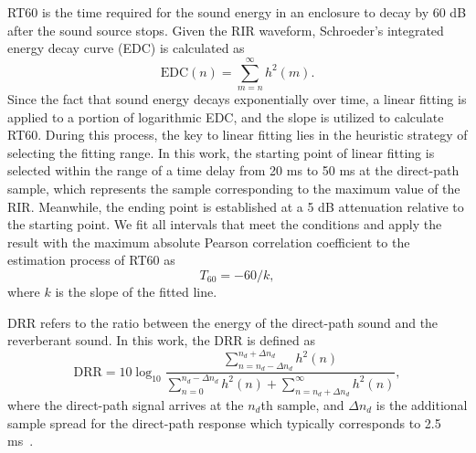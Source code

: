 RT60 is the time required for the sound energy in an enclosure to decay by 60 dB after the sound source stops.
Given the RIR waveform, Schroeder’s integrated energy decay curve (EDC) is calculated as~\cite{schroeder1965new}
\begin{equation}
\label{eq:edc}
    \mathrm{EDC}(n)=\sum_{m=n}^{\infty}h^2(m).
\end{equation}
Since the fact that sound energy decays exponentially over time, a linear fitting is applied to a portion of logarithmic EDC, and the slope is utilized to calculate RT60.
During this process, the key to linear fitting lies in the heuristic strategy of selecting the fitting range.
In this work, the starting point of linear fitting is selected within the range of a time delay from 20 ms to 50 ms at the direct-path sample, which represents the sample corresponding to the maximum value of the RIR. 
Meanwhile, the ending point is established at a 5 dB attenuation relative to the starting point.
We fit all intervals that meet the conditions and apply the result with the maximum absolute Pearson correlation coefficient to the estimation process of RT60 as
\begin{equation}
    T_{60}=-60/k,
\end{equation}
where $k$ is the slope of the fitted line.

DRR refers to the ratio between the energy of the direct-path sound and the reverberant sound.
In this work, the DRR is defined as
\begin{equation}
    \mathrm{DRR}=10\log_{10}\frac{\sum_{n=n_d-\Delta n_d}^{n_d+\Delta n_d}h^2(n)}{\sum_{n=0}^{n_d-\Delta n_d}h^2(n)+\sum_{n=n_d+\Delta n_d}^{\infty}h^2(n)},
\end{equation}
where the direct-path signal arrives at the $n_d$th sample, and $\Delta n_d$ is the additional sample spread for the direct-path response which typically corresponds to 2.5 ms~\cite{eaton2016estimation}.








